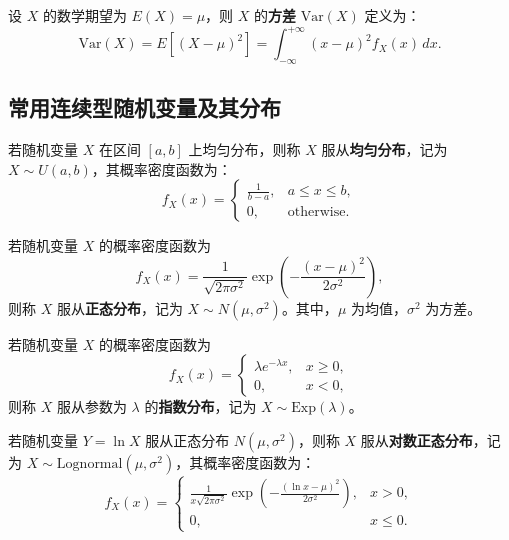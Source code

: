 \documentclass[UTF8]{ctexart}
\begin{document}
	\begin{tcolorbox}[colback=definition!5!white, colframe=definition!75!black, title=方差]
		设 $X$ 的数学期望为 $E(X) = \mu$，则 $X$ 的\textbf{方差} $\text{Var}(X)$ 定义为：
		\[
		\text{Var}(X) = E\left[(X - \mu)^2\right] = \int_{-\infty}^{+\infty} (x - \mu)^2 f_X(x) \, dx.
		\]
	\end{tcolorbox}
	
	\subsection{常用连续型随机变量及其分布}
	
	\begin{tcolorbox}[colback=definition!5!white, colframe=definition!75!black, title=均匀分布]
		若随机变量 $X$ 在区间 $[a, b]$ 上均匀分布，则称 $X$ 服从\textbf{均匀分布}，记为 $X \sim U(a, b)$，其概率密度函数为：
		\[
		f_X(x) = 
		\begin{cases}
			\frac{1}{b - a}, & a \leq x \leq b, \\
			0, & \text{otherwise}.
		\end{cases}
		\]
	\end{tcolorbox}
	
	\begin{tcolorbox}[colback=definition!5!white, colframe=definition!75!black, title=正态分布]
		若随机变量 $X$ 的概率密度函数为
		\[
		f_X(x) = \frac{1}{\sqrt{2\pi \sigma^2}} \exp\left(-\frac{(x - \mu)^2}{2\sigma^2}\right),
		\]
		则称 $X$ 服从\textbf{正态分布}，记为 $X \sim N(\mu, \sigma^2)$。其中，$\mu$ 为均值，$\sigma^2$ 为方差。
	\end{tcolorbox}
	
	\begin{tcolorbox}[colback=definition!5!white, colframe=definition!75!black, title=指数分布]
		若随机变量 $X$ 的概率密度函数为
		\[
		f_X(x) = 
		\begin{cases}
			\lambda e^{-\lambda x}, & x \geq 0, \\
			0, & x < 0,
		\end{cases}
		\]
		则称 $X$ 服从参数为 $\lambda$ 的\textbf{指数分布}，记为 $X \sim \text{Exp}(\lambda)$。
	\end{tcolorbox}
	
	\begin{tcolorbox}[colback=definition!5!white, colframe=definition!75!black, title=对数正态分布]
		若随机变量 $Y = \ln X$ 服从正态分布 $N(\mu, \sigma^2)$，则称 $X$ 服从\textbf{对数正态分布}，记为 $X \sim \text{Lognormal}(\mu, \sigma^2)$，其概率密度函数为：
		\[
		f_X(x) = 
		\begin{cases}
			\frac{1}{x \sqrt{2\pi \sigma^2}} \exp\left(-\frac{(\ln x - \mu)^2}{2\sigma^2}\right), & x > 0, \\
			0, & x \leq 0.
		\end{cases}
		\]
	\end{tcolorbox}
	
\end{document}
